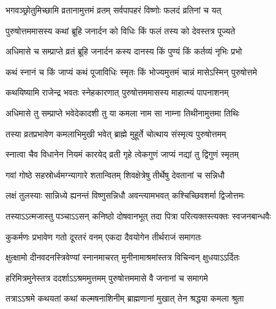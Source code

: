 \label{sec:padma-purushottama-shukla-kamala}

\ganapatyadiDhyanam
\padmaPuranam



\twolineshloka
{भगवञ्छ्रोतुमिच्छामि व्रतानामुत्तमं व्रतम्}
{सर्वपापहरं विष्णोः फलदं व्रतिनां च यत्}%

\twolineshloka
{पुरुषोत्तममासस्य कथां ब्रूहि जनार्दन}
{को विधिः किं फलं तस्य को देवस्तत्र पूज्यते}%

\twolineshloka
{अधिमासे च सम्प्राप्ते व्रतं ब्रूहि जनार्दन}
{कस्य दानस्य किं पुण्यं किं कर्तव्यं नृभिः प्रभो}%

\twolineshloka
{कथं स्नानं च किं जाप्यं कथं पूजाविधिः स्मृतः}
{किं भोज्यमुत्तमं चान्नं मासेऽस्मिन् पुरुषोत्तमे}%


\twolineshloka
{कथयिष्यामि राजेन्द्र भवतः स्नेहकारणात्}
{पुरुषोत्तममासस्य माहात्म्यं पापनाशनम्}%

\twolineshloka
{अधिमासे तु सम्प्राप्ते भवेदेकादशी तु या}
{कमला नाम सा नाम्ना तिथीनामुत्तमा तिथिः}%

\twolineshloka
{तस्या व्रतप्रभावेण कमलाभिमुखी भवेत्}
{ब्राह्मे मुहूर्ते चोत्थाय संस्मृत्य पुरुषोत्तमम्}%

\twolineshloka
{स्नात्वा चैव विधानेन नियमं कारयेद् व्रती}
{गृहे त्वेकगुणं जाप्यं नद्यां तु द्विगुणं स्मृतम्}%

\twolineshloka
{गवां गोष्ठे सहस्रोर्ध्वमग्न्यागारे शतान्वितम्}
{शिवक्षेत्रेषु तीर्थेषु देवतानां च सन्निधौ}%

\twolineshloka
{लक्षं तुलस्याः सान्निध्ये ह्यनन्तं विष्णुसन्निधौ}
{अवन्त्यामभवत् कश्चिच्छिवशर्मा द्विजोत्तमः}%

\twolineshloka
{तस्याऽऽत्मजास्तु पञ्चाऽऽसन् कनिष्ठो दोषवानभूत्}
{तदा पित्रा परित्यक्तस्त्यक्तः स्वजनबान्धवैः}%

\twolineshloka
{कुकर्मणः प्रभावेण गतो दूरतरं वनम्}
{एकदा दैवयोगेन तीर्थराजं समागतः}%

\twolineshloka
{क्षुत्क्षामो दीनवदनस्त्रिवेण्यां स्नानमाचरत्}
{मुनीनामाश्रमांस्तत्र विचिन्वन् क्षुधयाऽऽर्दितः}%

\twolineshloka
{हरिमित्रमुनेस्तत्र ददर्शाऽऽश्रममुत्तमम्}
{पुरुषोत्तममासे वै जनानां च समागमे}%

\twolineshloka
{तत्राऽऽश्रमे कथयतां कथां कल्मषनाशिनीम्}
{ब्राह्मणानां मुखात् तेन श्रद्धया कमला श्रुता}%

